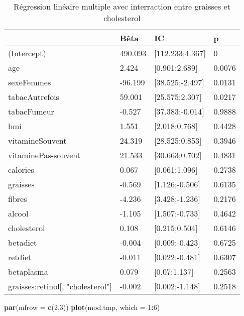 \documentclass[]{article}
\newenvironment{Shaded}{\begin{snugshade}}{\end{snugshade}}
\newcommand{\KeywordTok}[1]{\textcolor[rgb]{0.13,0.29,0.53}{\textbf{#1}}}
\newcommand{\DataTypeTok}[1]{\textcolor[rgb]{0.13,0.29,0.53}{#1}}
\newcommand{\DecValTok}[1]{\textcolor[rgb]{0.00,0.00,0.81}{#1}}
\newcommand{\OperatorTok}[1]{\textcolor[rgb]{0.81,0.36,0.00}{\textbf{#1}}}
\newcommand{\NormalTok}[1]{#1}
\begin{document}
\begin{table}

\caption{\label{tab:unnamed-chunk-75}Régression linéaire multiple avec interraction entre graisses et cholesterol}
\centering
\begin{tabular}[t]{l|l|l|l}
\hline
  & Bêta & IC & p\\
\hline
\rowcolor[HTML]{BBD2E1}  (Intercept) & 490.093 & [112.233;4.367] & 0\\
\hline
age & 2.424 & [0.901;2.689] & 0.0076\\
\hline
\rowcolor[HTML]{BBD2E1}  sexeFemmes & -96.199 & [38.525;-2.497] & 0.0131\\
\hline
tabacAutrefois & 59.001 & [25.575;2.307] & 0.0217\\
\hline
\rowcolor[HTML]{BBD2E1}  tabacFumeur & -0.527 & [37.383;-0.014] & 0.9888\\
\hline
bmi & 1.551 & [2.018;0.768] & 0.4428\\
\hline
\rowcolor[HTML]{BBD2E1}  vitamineSouvent & 24.319 & [28.525;0.853] & 0.3946\\
\hline
vitaminePas-souvent & 21.533 & [30.663;0.702] & 0.4831\\
\hline
\rowcolor[HTML]{BBD2E1}  calories & 0.067 & [0.061;1.096] & 0.2738\\
\hline
graisses & -0.569 & [1.126;-0.506] & 0.6135\\
\hline
\rowcolor[HTML]{BBD2E1}  fibres & -4.236 & [3.428;-1.236] & 0.2176\\
\hline
alcool & -1.105 & [1.507;-0.733] & 0.4642\\
\hline
\rowcolor[HTML]{BBD2E1}  cholesterol & 0.108 & [0.215;0.504] & 0.6146\\
\hline
betadiet & -0.004 & [0.009;-0.423] & 0.6725\\
\hline
\rowcolor[HTML]{BBD2E1}  retdiet & -0.011 & [0.022;-0.481] & 0.6307\\
\hline
betaplasma & 0.079 & [0.07;1.137] & 0.2563\\
\hline
\rowcolor[HTML]{BBD2E1}  graisses:retinol[, "cholesterol"] & -0.002 & [0.002;-1.148] & 0.2518\\
\hline
\end{tabular}
\end{table}

\begin{Shaded}
\begin{Highlighting}[]
\KeywordTok{par}\NormalTok{(}\DataTypeTok{mfrow =} \KeywordTok{c}\NormalTok{(}\DecValTok{2}\NormalTok{,}\DecValTok{3}\NormalTok{))}
\KeywordTok{plot}\NormalTok{(mod.tmp, }\DataTypeTok{which =} \DecValTok{1}\OperatorTok{:}\DecValTok{6}\NormalTok{)}
\end{Highlighting}
\end{Shaded}
\end{document}
